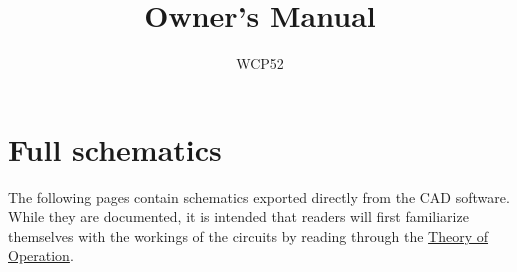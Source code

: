 \documentclass[article,oneside]{memoir}
\title{Owner's Manual}
\author{WCP52}
\begin{document}
\pagestyle{headings}

\begin{multicols}{2}

\tableofcontents
\listoffigures

\newpage


\newpage


\newpage


\newpage


\end{multicols}

\newpage
{}

\newpage
\chapter{Full schematics}
The following pages contain schematics exported directly from the CAD software.
While they are documented, it is intended that readers will first familiarize
themselves with the workings of the circuits by reading through the
\hyperref[chap:too]{Theory of Operation}.

\newpage

\end{document}
